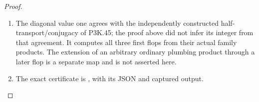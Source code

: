 \begin{proof}
\begin{enumerate}[label=\arabic*.]
\item The diagonal value one agrees with the independently constructed
half-transport/conjugacy of P3K.45; the proof above did not infer its
integer from that agreement. It computes all three first flops
from their actual family products. The extension of an arbitrary
ordinary plumbing product through a later flop is a separate map
and is not asserted here.

\item The exact certificate is , with its JSON and captured output.

\end{enumerate}
\end{proof}